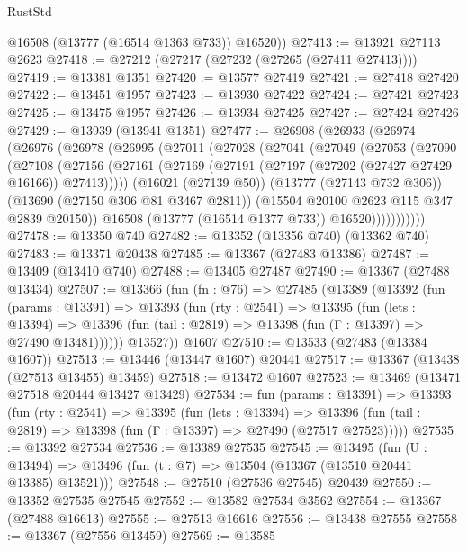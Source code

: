 \begin{lexlean}{RustStd}
\begin{coremodule}
        @16508
        (@13777 (@16514 @1363 @733))
        @16520))
@27413 := @13921 @27113 @2623
@27418 := @27212 (@27217 (@27232 (@27265 (@27411 @27413))))
@27419 := @13381 @1351
@27420 := @13577 @27419
@27421 := @27418 @27420
@27422 := @13451 @1957
@27423 := @13930 @27422
@27424 := @27421 @27423
@27425 := @13475 @1957
@27426 := @13934 @27425
@27427 := @27424 @27426
@27429 := @13939 (@13941 @1351)
@27477 := @26908
    (@26933
      (@26974
        (@26976
          (@26978
            (@26995
              (@27011
                (@27028
                  (@27041
                    (@27049
                      (@27053
                        (@27090
                          (@27108
                            (@27156
                              (@27161
                                (@27169 (@27191 (@27197 (@27202 (@27427 @27429 @16166)) @27413)))))
                            (@16021 (@27139 @50))
                            (@13777 (@27143 @732 @306))
                            (@13690 (@27150 @306 @81 @3467 @2811))
                            (@15504 @20100 @2623 @115 @347 @2839 @20150))
                          @16508
                          (@13777 (@16514 @1377 @733))
                          @16520)))))))))))
@27478 := @13350 @740
@27482 := @13352 (@13356 @740) (@13362 @740)
@27483 := @13371 @20438
@27485 := @13367 (@27483 @13386)
@27487 := @13409 (@13410 @740)
@27488 := @13405 @27487
@27490 := @13367 (@27488 @13434)
@27507 := @13366
    (fun (fn : @76) =>
    @27485
      (@13389
        (@13392
          (fun (params : @13391) =>
          @13393
            (fun (rty : @2541) =>
            @13395
              (fun (lets : @13394) =>
              @13396 (fun (tail : @2819) => @13398 (fun (Γ : @13397) => @27490 @13481))))))
        @13527))
    @1607
@27510 := @13533 (@27483 (@13384 @1607))
@27513 := @13446 (@13447 @1607) @20441
@27517 := @13367 (@13438 (@27513 @13455) @13459)
@27518 := @13472 @1607
@27523 := @13469 (@13471 @27518 @20444 @13427 @13429)
@27534 := fun (params : @13391) =>
  @13393
    (fun (rty : @2541) =>
    @13395
      (fun (lets : @13394) =>
      @13396 (fun (tail : @2819) => @13398 (fun (Γ : @13397) => @27490 (@27517 @27523)))))
@27535 := @13392 @27534
@27536 := @13389 @27535
@27545 := @13495
    (fun (U : @13494) => @13496 (fun (t : @7) => @13504 (@13367 (@13510 @20441 @13385) @13521)))
@27548 := @27510 (@27536 @27545) @20439
@27550 := @13352 @27535 @27545
@27552 := @13582 @27534 @3562
@27554 := @13367 (@27488 @16613)
@27555 := @27513 @16616
@27556 := @13438 @27555
@27558 := @13367 (@27556 @13459)
@27569 := @13585

\end{coremodule}
\end{lexlean}
